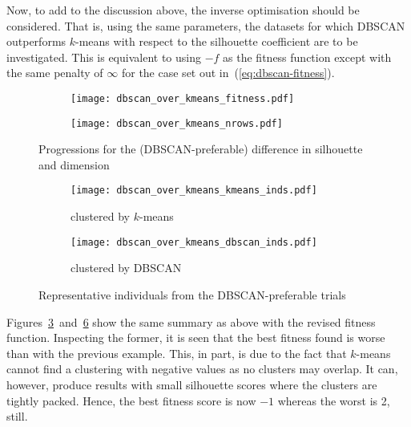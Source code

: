 Now, to add to the discussion above, the inverse optimisation should be
considered. That is, using the same parameters, the datasets for which DBSCAN
outperforms \(k\)-means with respect to the silhouette coefficient are to be
investigated. This is equivalent to using \(-f\) as the fitness function
except with the same penalty of \(\infty\) for the case set out
in~(\ref{eq:dbscan-fitness}).

\begin{figure}[htbp]
    \centering
    \begin{subfigure}{\imgwidth}
        \texttt{[image: dbscan\_over\_kmeans\_fitness.pdf]}
        \label{fig:dbscan_over_kmeans_fitness}
    \end{subfigure}

    \begin{subfigure}{\imgwidth}
        \texttt{[image: dbscan\_over\_kmeans\_nrows.pdf]}
        \label{fig:dbscan_over_kmeans_nrows}
    \end{subfigure}
    \caption{%
        Progressions for the (DBSCAN-preferable) difference in silhouette and
        dimension
    }\label{fig:negative-prog}
\end{figure}

\begin{figure}
    \centering
    \begin{subfigure}{\imgwidth}
        \centering
        \texttt{[image: dbscan\_over\_kmeans\_kmeans\_inds.pdf]}
        \caption{%
            clustered by \(k\)-means
        }\label{fig:dbscan_over_kmeans_kmeans_inds}
    \end{subfigure}

    \begin{subfigure}{\imgwidth}
        \centering
        \texttt{[image: dbscan\_over\_kmeans\_dbscan\_inds.pdf]}
        \caption{clustered by DBSCAN}\label{fig:dbscan_over_kmeans_dbscan_inds}
    \end{subfigure}
    \caption{%
        Representative individuals from the DBSCAN-preferable trials
    }\label{fig:negative-inds}
\end{figure}

Figures~\ref{fig:negative-prog}~and~\ref{fig:negative-inds} show the same
summary as above with the revised fitness function. Inspecting the former, it is
seen that the best fitness found is worse than with the previous example. This,
in part, is due to the fact that \(k\)-means cannot find a clustering with
negative values as no clusters may overlap. It can, however, produce results
with small silhouette scores where the clusters are tightly packed. Hence, the
best fitness score is now \(-1\) whereas the worst is 2, still.

